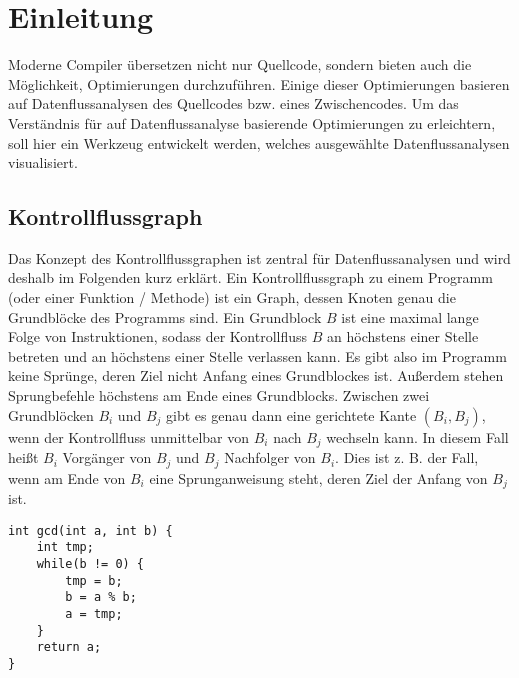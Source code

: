 
\section{Einleitung}

Moderne Compiler übersetzen nicht nur Quellcode, sondern bieten auch die Möglichkeit, Optimierungen durchzuführen. 
Einige dieser Optimierungen basieren auf Datenflussanalysen des Quellcodes bzw. eines Zwischencodes.
Um das Verständnis für auf Datenflussanalyse basierende Optimierungen zu erleichtern, soll hier ein Werkzeug entwickelt werden, welches ausgewählte Datenflussanalysen visualisiert.

\subsection{Kontrollflussgraph}
Das Konzept des Kontrollflussgraphen ist zentral für Datenflussanalysen und wird deshalb im Folgenden kurz erklärt.
Ein Kontrollflussgraph zu einem Programm (oder einer Funktion / Methode) ist ein Graph, dessen Knoten genau die Grundblöcke des Programms sind.
Ein Grundblock $B$ ist eine maximal lange Folge von Instruktionen, sodass der Kontrollfluss $B$ an höchstens einer Stelle betreten und an höchstens einer Stelle verlassen kann.
Es gibt also im Programm keine Sprünge, deren Ziel nicht Anfang eines Grundblockes ist.
Außerdem stehen Sprungbefehle höchstens am Ende eines Grundblocks.
Zwischen zwei Grundblöcken $B_i$ und $B_j$ gibt es genau dann eine gerichtete Kante $(B_i,B_j)$, wenn der Kontrollfluss unmittelbar von $B_i$ nach $B_j$ wechseln kann.
In diesem Fall heißt $B_i$ Vorgänger von $B_j$ und $B_j$ Nachfolger von $B_i$.
Dies ist z. B. der Fall, wenn am Ende von $B_i$ eine Sprunganweisung steht, deren Ziel der Anfang von $B_j$ ist.

\par

\begin{lstlisting}[frame=single, captionpos=b, caption=Simple Funktion zur Veranschaulichung eines CFG]
int gcd(int a, int b) {
	int tmp;
	while(b != 0) {
		tmp = b;
		b = a % b;
		a = tmp;
	}
	return a;
}
\end{lstlisting}

\par


